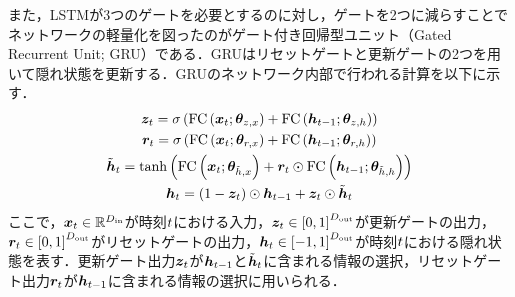 また，LSTMが3つのゲートを必要とするのに対し，ゲートを2つに減らすことでネットワークの軽量化を図ったのがゲート付き回帰型ユニット（Gated Recurrent Unit; GRU）\cite{cho2014learning}である．GRUはリセットゲートと更新ゲートの2つを用いて隠れ状態を更新する．GRUのネットワーク内部で行われる計算を以下に示す．
\begin{gather}
    \bm{z}_{t} = \sigma\left(\text{FC}\left(\bm{x}_{t}; \bm{\theta}_{z, x}\right) + \text{FC}\left(\bm{h}_{t-1}; \bm{\theta}_{z, h}\right)\right) \\
    \bm{r}_{t} = \sigma\left(\text{FC}\left(\bm{x}_{t}; \bm{\theta}_{r, x}\right) + \text{FC}\left(\bm{h}_{t-1}; \bm{\theta}_{r, h}\right)\right) \\
    \tilde{\bm{h}}_{t} = \tanh\left(\text{FC}\left(\bm{x}_{t}; \bm{\theta}_{\tilde{h}, x}\right) + \bm{r}_{t} \odot \text{FC}\left(\bm{h}_{t-1}; \bm{\theta}_{\tilde{h}, h}\right)\right) \\
    \bm{h}_{t} = \left(1 - \bm{z}_{t}\right) \odot \bm{h}_{t-1} + \bm{z}_{t} \odot \tilde{\bm{h}}_{t}
\end{gather}
ここで，$\bm{x}_{t} \in \mathbb{R}^{D_{\text{in}}}$が時刻$t$における入力，$\bm{z}_{t} \in \left[0, 1\right]^{D_{\text{out}}}$が更新ゲートの出力，$\bm{r}_{t} \in \left[0, 1\right]^{D_{\text{out}}}$がリセットゲートの出力，$\bm{h}_{t} \in \left[-1, 1\right]^{D_{\text{out}}}$が時刻$t$における隠れ状態を表す．更新ゲート出力$\bm{z}_{t}$が$\bm{h}_{t - 1}$と$\tilde{\bm{h}}_{t}$に含まれる情報の選択，リセットゲート出力$\bm{r}_{t}$が$\bm{h}_{t - 1}$に含まれる情報の選択に用いられる．

